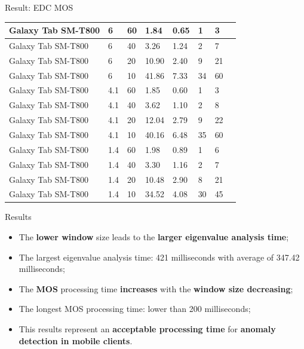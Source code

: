 \documentclass[newPxFont, numfooter, sectionpages]{beamer}
\begin{document}
\begin{frame}[c]{Result: EDC MOS}
\begin{table}[!t]
\begin{tabular}{|l|l|l|l|l|l|l|l|}
			Galaxy Tab SM-T800	& 6	& 60	& 1.84	& 0.65	& 1	& 3	\\ \hline
			Galaxy Tab SM-T800	& 6	& 40	& 3.26	& 1.24	& 2	& 7	\\ \hline
			Galaxy Tab SM-T800	& 6	& 20	& 10.90	& 2.40	& 9	& 21	\\ \hline
			Galaxy Tab SM-T800	& 6	& 10	& 41.86	& 7.33	& 34	& 60	\\ \hline
			Galaxy Tab SM-T800	& 4.1	& 60	& 1.85	& 0.60	& 1	& 3	\\ \hline
			Galaxy Tab SM-T800	& 4.1	& 40	& 3.62	& 1.10	& 2	& 8	\\ \hline
			Galaxy Tab SM-T800	& 4.1	& 20	& 12.04	& 2.79	& 9	& 22	\\ \hline
			Galaxy Tab SM-T800	& 4.1	& 10	& 40.16	& 6.48	& 35	& 60	\\ \hline
			Galaxy Tab SM-T800	& 1.4	& 60	& 1.98	& 0.89	& 1	& 6	\\ \hline
			Galaxy Tab SM-T800	& 1.4	& 40	& 3.30	& 1.16	& 2	& 7	\\ \hline
			Galaxy Tab SM-T800	& 1.4	& 20	& 10.48	& 2.90	& 8	& 21	\\ \hline
			Galaxy Tab SM-T800	& 1.4	& 10	& 34.52	& 4.08	& 30	& 45	\\ \hline
		\end{tabular}
	\end{table}
	
\end{frame}
\begin{frame}[c]{Results}
	
	\begin{itemize}
		\item The \textbf{lower window} size leads to the \textbf{larger eigenvalue analysis time};
		\item The largest eigenvalue analysis time: 421 milliseconds with average of 347.42 milliseconds;
		\item The \textbf{MOS} processing time \textbf{increases} with the \textbf{window size decreasing};
		\item The longest MOS processing time: lower than 200 milliseconds;
		\item This results represent an \textbf{acceptable processing time} for \textbf{anomaly detection in mobile clients}.
	\end{itemize}
	
\end{frame}
\end{document}
